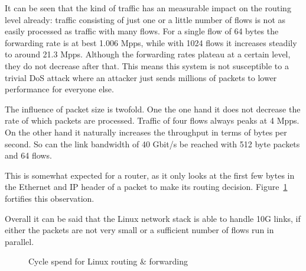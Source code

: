 \documentclass[IN,11pt,twoside,openright,master,english]{tumthesis}
\begin{document}
It can be seen that the kind of traffic has an measurable impact on the routing level already: traffic consisting of just one or a little number of flows is not as easily processed as traffic with many flows. For a single flow of 64 bytes the forwarding rate is at best 1.006 Mpps, while with 1024 flows it increases steadily to around 21.3 Mpps. 
Although the forwarding rates plateau at a certain level, they do not decrease after that. This means this system is not susceptible to a trivial DoS attack where an attacker just sends millions of packets to lower performance for everyone else.

The influence of packet size is twofold. One the one hand it does not decrease the rate of which packets are processed. Traffic of four flows always peaks at 4 Mpps. On the other hand it naturally increases the throughput in terms of bytes per second. So can the link bandwidth of 40 Gbit/s be reached with 512 byte packets and 64 flows.

This is somewhat expected for a router, as it only looks at the first few bytes in the Ethernet and IP header of a packet to make its routing decision. Figure~\ref{fig:linux-router-cycles} fortifies this observation.

Overall it can be said that the Linux network stack is able to handle 10G links, if either the packets are not very small or a sufficient number of flows run in parallel.

\begin{figure}[h!]
	\centering
	
	
	\caption{Cycle spend for Linux routing \& forwarding}
	\label{fig:linux-router-cycles}
\end{figure}
\end{document}
